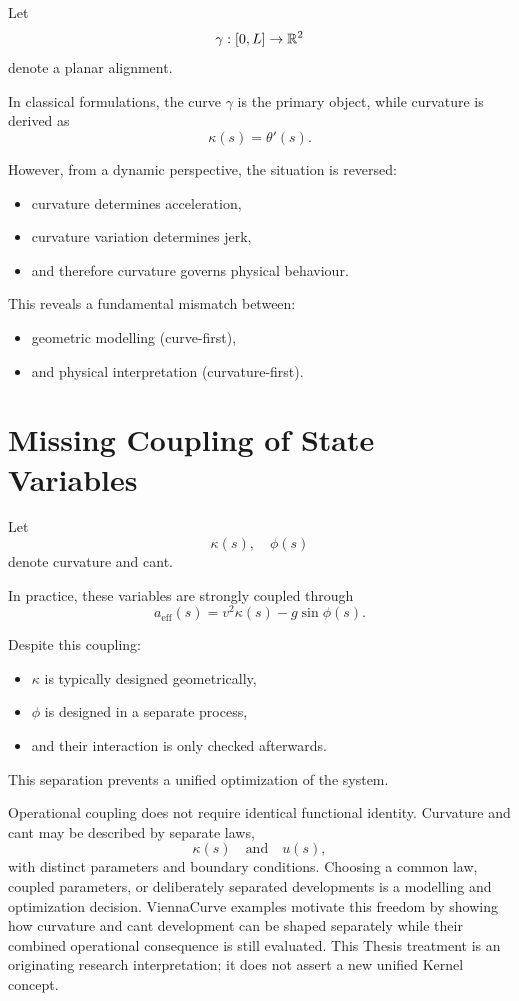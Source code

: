 Let
\[
\gamma : [0,L] \to \mathbb{R}^2
\]
denote a planar alignment.

In classical formulations, the curve \(\gamma\) is the primary object,
while curvature is derived as
\[
\kappa(s) = \theta'(s).
\]

However, from a dynamic perspective, the situation is reversed:
\begin{itemize}
\item curvature determines acceleration,
\item curvature variation determines jerk,
\item and therefore curvature governs physical behaviour.
\end{itemize}

This reveals a fundamental mismatch between:
\begin{itemize}
\item geometric modelling (curve-first),
\item and physical interpretation (curvature-first).
\end{itemize}

\section{Missing Coupling of State Variables}

Let
\[
\kappa(s), \quad \phi(s)
\]
denote curvature and cant.

In practice, these variables are strongly coupled through
\[
a_{\mathrm{eff}}(s) = v^2 \kappa(s) - g \sin\phi(s).
\]

Despite this coupling:
\begin{itemize}
\item \(\kappa\) is typically designed geometrically,
\item \(\phi\) is designed in a separate process,
\item and their interaction is only checked afterwards.
\end{itemize}

This separation prevents a unified optimization of the system.

Operational coupling does not require identical functional identity. Curvature
and cant may be described by separate laws,
\[
\kappa(s) \quad\text{and}\quad u(s),
\]
with distinct parameters and boundary conditions. Choosing a common law,
coupled parameters, or deliberately separated developments is a modelling and
optimization decision. ViennaCurve examples motivate this freedom by showing
how curvature and cant development can be shaped separately while their
combined operational consequence is still evaluated. This Thesis treatment is
an originating research interpretation; it does not assert a new unified
Kernel concept.

